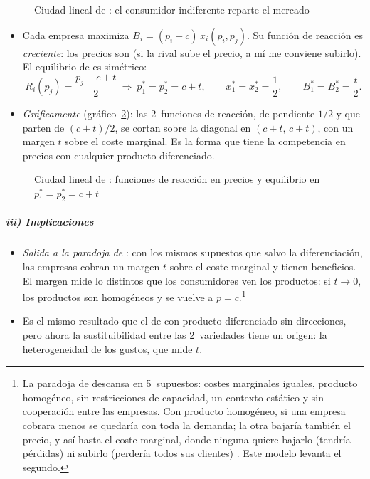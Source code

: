 \documentclass[11pt]{article}
\begin{document}
\begin{figure}[H]
\centering
\caption{Ciudad lineal de : el consumidor indiferente reparte el mercado}\label{fig:hotelling}
\end{figure}

\begin{itemize}
\item Cada empresa maximiza $B_i=(p_i-c)\,x_i(p_i,p_j)$. Su función de reacción es \emph{creciente}: los precios son  (si la rival sube el precio, a mí me conviene subirlo)\nocite{BulowGeanakoplosKlemperer1985Multimarket}. El equilibrio de  es simétrico:
  \begin{equation}\label{eq:hotelling-precios}
  R_i(p_j)=\frac{p_j+c+t}{2}\ \Longrightarrow\ p_1^*=p_2^*=c+t,\qquad x_1^*=x_2^*=\frac{1}{2},\qquad B_1^*=B_2^*=\frac{t}{2}.
  \end{equation}
\item \emph{Gráficamente} (gráfico~\ref{fig:hotelling-reaccion}): las 2~funciones de reacción, de pendiente $1/2$ y que parten de $(c+t)/2$, se cortan sobre la diagonal en $(c+t,\,c+t)$, con un margen $t$ sobre el coste marginal. Es la forma que tiene la competencia en precios con cualquier producto diferenciado.
\end{itemize}

\begin{figure}[H]
\centering
\caption{Ciudad lineal de : funciones de reacción en precios y equilibrio en $p_1^*=p_2^*=c+t$}\label{fig:hotelling-reaccion}
\end{figure}

\subparagraph{iii) Implicaciones}

\begin{itemize}
\item \emph{Salida a la paradoja de }: con los mismos supuestos que  salvo la diferenciación, las empresas cobran un margen $t$ sobre el coste marginal y tienen beneficios. El margen mide lo distintos que los consumidores ven los productos: si $t\to0$, los productos son homogéneos y se vuelve a $p=c$.\footnote{La paradoja de  descansa en 5~supuestos: costes marginales iguales, producto homogéneo, sin restricciones de capacidad, un contexto estático y sin cooperación entre las empresas. Con producto homogéneo, si una empresa cobrara menos se quedaría con toda la demanda; la otra bajaría también el precio, y así hasta el coste marginal, donde ninguna quiere bajarlo (tendría pérdidas) ni subirlo (perdería todos sus clientes) . Este modelo levanta el segundo.}
\item Es el mismo resultado que el de  con producto diferenciado sin direcciones, pero ahora la sustituibilidad entre las 2~variedades tiene un origen: la heterogeneidad de los gustos, que mide $t$.
\end{itemize}
\end{document}

